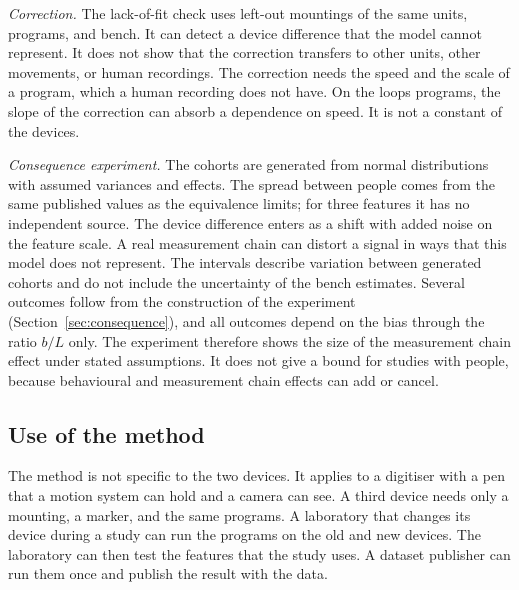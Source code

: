 \emph{Correction.}
The lack-of-fit check uses left-out mountings of the same units, programs, and bench.
It can detect a device difference that the model cannot represent.
It does not show that the correction transfers to other units, other movements, or human recordings.
The correction needs the speed and the scale of a program, which a human recording does not have.
On the loops programs, the slope of the correction can absorb a dependence on speed.
It is not a constant of the devices.

\emph{Consequence experiment.}
The cohorts are generated from normal distributions with assumed variances and effects.
The spread between people comes from the same published values as the equivalence limits; for three features it has no independent source.
The device difference enters as a shift with added noise on the feature scale.
A real measurement chain can distort a signal in ways that this model does not represent.
The intervals describe variation between generated cohorts and do not include the uncertainty of the bench estimates.
Several outcomes follow from the construction of the experiment (Section~\ref{sec:consequence}), and all outcomes depend on the bias through the ratio $b/L$ only.
The experiment therefore shows the size of the measurement chain effect under stated assumptions.
It does not give a bound for studies with people, because behavioural and measurement chain effects can add or cancel.

\subsection{Use of the method}
The method is not specific to the two devices.
It applies to a digitiser with a pen that a motion system can hold and a camera can see.
A third device needs only a mounting, a marker, and the same programs.
A laboratory that changes its device during a study can run the programs on the old and new devices.
The laboratory can then test the features that the study uses.
A dataset publisher can run them once and publish the result with the data.
